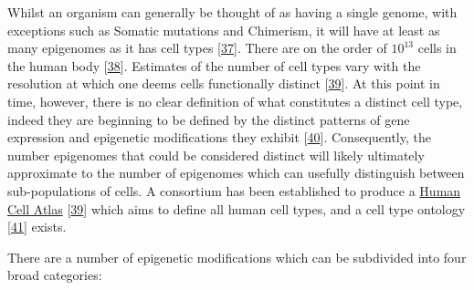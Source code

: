 \documentclass[
]{book}
\begin{document}
Whilst an organism can generally be thought of as having a single genome, with exceptions such as Somatic mutations and Chimerism, it will have at least as many epigenomes as it has cell types {[}\protect\hyperlink{ref-Tabansky2015}{37}{]}.
There are on the order of \(10^{13}\) cells in the human body {[}\protect\hyperlink{ref-Bianconi2013}{38}{]}.
Estimates of the number of cell types vary with the resolution at which one deems cells functionally distinct {[}\protect\hyperlink{ref-Regev2017}{39}{]}.
At this point in time, however, there is no clear definition of what constitutes a distinct cell type, indeed they are beginning to be defined by the distinct patterns of gene expression and epigenetic modifications they exhibit {[}\protect\hyperlink{ref-CellSystemsCellType2017}{40}{]}.
Consequently, the number epigenomes that could be considered distinct will likely ultimately approximate to the number of epigenomes which can usefully distinguish between sub-populations of cells.
A consortium has been established to produce a \href{www.humancellatlas.org}{Human Cell Atlas} {[}\protect\hyperlink{ref-Regev2017}{39}{]} which aims to define all human cell types, and a cell type ontology {[}\protect\hyperlink{ref-CellOntologyOBO}{41}{]} exists.

There are a number of epigenetic modifications which can be subdivided into four broad categories:
\end{document}
